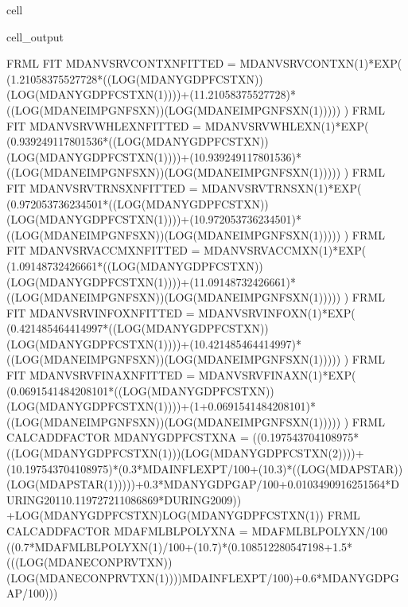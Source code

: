 \documentclass[letterpaper,10pt,english]{jupyterBook}
\begin{document}
\begin{sphinxuseclass}{cell}
\begin{sphinxVerbatimOutput}
\begin{sphinxuseclass}{cell_output}
\begin{sphinxVerbatim}[commandchars=\\\{\}]
FRML \PYGZlt{}FIT\PYGZgt{} MDANVSRVCONTXN\PYGZus{}FITTED = MDANVSRVCONTXN(\PYGZhy{}1)*EXP( (1.21058375527728*((LOG(MDANYGDPFCSTXN))\PYGZhy{}(LOG(MDANYGDPFCSTXN(\PYGZhy{}1))))+(1\PYGZhy{}1.21058375527728)*((LOG(MDANEIMPGNFSXN))\PYGZhy{}(LOG(MDANEIMPGNFSXN(\PYGZhy{}1))))) ) \PYGZdl{}
FRML \PYGZlt{}FIT\PYGZgt{} MDANVSRVWHLEXN\PYGZus{}FITTED = MDANVSRVWHLEXN(\PYGZhy{}1)*EXP( (0.939249117801536*((LOG(MDANYGDPFCSTXN))\PYGZhy{}(LOG(MDANYGDPFCSTXN(\PYGZhy{}1))))+(1\PYGZhy{}0.939249117801536)*((LOG(MDANEIMPGNFSXN))\PYGZhy{}(LOG(MDANEIMPGNFSXN(\PYGZhy{}1))))) ) \PYGZdl{}
FRML \PYGZlt{}FIT\PYGZgt{} MDANVSRVTRNSXN\PYGZus{}FITTED = MDANVSRVTRNSXN(\PYGZhy{}1)*EXP( (0.972053736234501*((LOG(MDANYGDPFCSTXN))\PYGZhy{}(LOG(MDANYGDPFCSTXN(\PYGZhy{}1))))+(1\PYGZhy{}0.972053736234501)*((LOG(MDANEIMPGNFSXN))\PYGZhy{}(LOG(MDANEIMPGNFSXN(\PYGZhy{}1))))) ) \PYGZdl{}
FRML \PYGZlt{}FIT\PYGZgt{} MDANVSRVACCMXN\PYGZus{}FITTED = MDANVSRVACCMXN(\PYGZhy{}1)*EXP( (1.09148732426661*((LOG(MDANYGDPFCSTXN))\PYGZhy{}(LOG(MDANYGDPFCSTXN(\PYGZhy{}1))))+(1\PYGZhy{}1.09148732426661)*((LOG(MDANEIMPGNFSXN))\PYGZhy{}(LOG(MDANEIMPGNFSXN(\PYGZhy{}1))))) ) \PYGZdl{}
FRML \PYGZlt{}FIT\PYGZgt{} MDANVSRVINFOXN\PYGZus{}FITTED = MDANVSRVINFOXN(\PYGZhy{}1)*EXP( (0.421485464414997*((LOG(MDANYGDPFCSTXN))\PYGZhy{}(LOG(MDANYGDPFCSTXN(\PYGZhy{}1))))+(1\PYGZhy{}0.421485464414997)*((LOG(MDANEIMPGNFSXN))\PYGZhy{}(LOG(MDANEIMPGNFSXN(\PYGZhy{}1))))) ) \PYGZdl{}
FRML \PYGZlt{}FIT\PYGZgt{} MDANVSRVFINAXN\PYGZus{}FITTED = MDANVSRVFINAXN(\PYGZhy{}1)*EXP( (\PYGZhy{}0.0691541484208101*((LOG(MDANYGDPFCSTXN))\PYGZhy{}(LOG(MDANYGDPFCSTXN(\PYGZhy{}1))))+(1+0.0691541484208101)*((LOG(MDANEIMPGNFSXN))\PYGZhy{}(LOG(MDANEIMPGNFSXN(\PYGZhy{}1))))) ) \PYGZdl{}FRML \PYGZlt{}CALC\PYGZus{}ADD\PYGZus{}FACTOR\PYGZgt{} MDANYGDPFCSTXN\PYGZus{}A = \PYGZhy{} ((0.197543704108975*((LOG(MDANYGDPFCSTXN(\PYGZhy{}1)))\PYGZhy{}(LOG(MDANYGDPFCSTXN(\PYGZhy{}2))))+(1\PYGZhy{}0.197543704108975)*(0.3*MDAINFLEXPT/100+(1\PYGZhy{}0.3)*((LOG(MDAPSTAR))\PYGZhy{}(LOG(MDAPSTAR(\PYGZhy{}1)))))+0.3*MDANYGDPGAP\PYGZus{}/100+0.0103490916251564*DURING\PYGZus{}2011\PYGZhy{}0.119727211086869*DURING\PYGZus{}2009)) +LOG(MDANYGDPFCSTXN)\PYGZhy{}LOG(MDANYGDPFCSTXN(\PYGZhy{}1))\PYGZdl{}
FRML \PYGZlt{}CALC\PYGZus{}ADD\PYGZus{}FACTOR\PYGZgt{} MDAFMLBLPOLYXN\PYGZus{}A = MDAFMLBLPOLYXN/100\PYGZhy{} ((0.7*MDAFMLBLPOLYXN(\PYGZhy{}1)/100+(1\PYGZhy{}0.7)*(0.108512280547198+1.5*(((LOG(MDANECONPRVTXN))\PYGZhy{}(LOG(MDANECONPRVTXN(\PYGZhy{}1))))\PYGZhy{}MDAINFLEXPT/100)+0.6*MDANYGDPGAP\PYGZus{}/100))) \PYGZdl{}

\end{sphinxVerbatim}
\end{sphinxuseclass}
\end{sphinxVerbatimOutput}
\end{sphinxuseclass}
\end{document}
